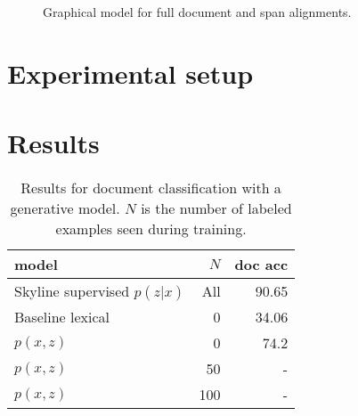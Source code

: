 \documentclass[11pt]{article}
\begin{document}
\begin{figure}[t]
\begin{center}
\end{center}
\caption{Graphical model for full document and span alignments.
}
\label{fig:pgm-sent}
\end{figure}

\section{Experimental setup}

\section{Results}

\begin{table}
\centering
\begin{tabular}{lrr}
\toprule
model & $N$ & doc acc\\
\midrule
Skyline supervised $p(z|x)$ & All & 90.65\\
Baseline lexical & 0 & 34.06\\
$p(x,z)$ & 0 & 74.2\\
$p(x,z)$ & 50 & -\\
$p(x,z)$ & 100 & -\\
\bottomrule
\end{tabular}
\caption{
\label{tbl:unsup-doc}
Results for document classification with a generative model.
$N$ is the number of labeled examples seen during training.}
\end{table}




\end{document}
